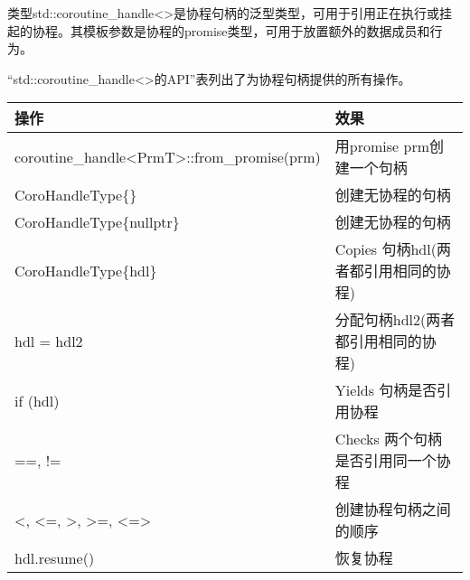 
类型std::coroutine\_handle<>是协程句柄的泛型类型，可用于引用正在执行或挂起的协程。其模板参数是协程的promise类型，可用于放置额外的数据成员和行为。

“std::coroutine\_handle<>的API”表列出了为协程句柄提供的所有操作。

\begin{longtable}[c]{|l|l|}
\hline
\textbf{操作}                                                                     & \textbf{效果}                                                                        \\ \hline
\endfirsthead
%
\endhead
%
coroutine\_handle\textless{}PrmT\textgreater{}::from\_promise(prm)                     & 用promise prm创建一个句柄                                                  \\ \hline
CoroHandleType\{\}                                                                     & 创建无协程的句柄                                                       \\ \hline
CoroHandleType\{nullptr\}                                                              & 创建无协程的句柄                                                      \\ \hline
CoroHandleType\{hdl\}                                                                  & Copies 句柄hdl(两者都引用相同的协程)                               \\ \hline
hdl = hdl2                                                                             & 分配句柄hdl2(两者都引用相同的协程)                             \\ \hline
if (hdl)                                                                               & Yields 句柄是否引用协程                                    \\ \hline
==, !=                                                                                 & Checks 两个句柄是否引用同一个协程                                 \\ \hline
\textless{}, \textless{}=, \textgreater{}, \textgreater{}=, \textless{}=\textgreater{} & 创建协程句柄之间的顺序                                             \\ \hline
hdl.resume()                                                                           & 恢复协程                                                                 \\ \hline

\end{longtable}
